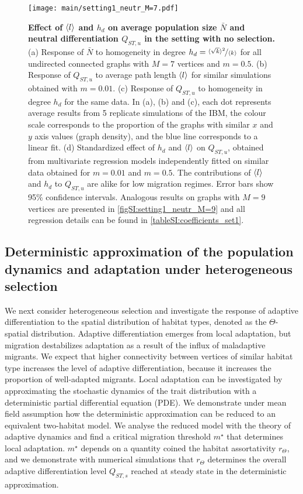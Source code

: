 \begin{figure}[ht]
    \centering
      \texttt{[image: main/setting1\_neutr\_M=7.pdf]}
      \caption{ 
      \textbf{Effect of $\langle l \rangle$ and $h_d$ on average population size $\bar{N}$ and neutral differentiation $Q_{ST,u}$ in the setting with no selection.}
      (a) Response of $\bar{N}$ to homogeneity in degree $h_d = \nicefrac{\langle \sqrt{k} \rangle^2}{\langle k \rangle}$ for all undirected connected graphs with $M=7$ vertices and $m=0.5$.
      (b) Response of $Q_{ST,u}$ to average path length $\langle l \rangle$ for similar simulations obtained with $m=0.01$.
      (c) Response of $Q_{ST,u}$ to homogeneity in degree $h_d$ for the same data.
      In (a), (b) and (c), each dot represents average results from 5 replicate simulations of the IBM, the colour scale corresponds to the proportion of the graphs with similar $x$ and $y$ axis values (graph density), and the blue line corresponds to a linear fit. 
      (d) Standardized effect of $h_d$ and $\langle l \rangle$ on $Q_{ST,u}$, obtained from multivariate regression models independently fitted on similar data obtained for $m = 0.01$ and $m=0.5$.
      The contributions of $\langle l \rangle$ and $h_d$ to $Q_{ST,u}$ are alike for low migration regimes. Error bars show 95\% confidence intervals.
      Analogous results on graphs with $M=9$ vertices are presented in \cref{figSI:setting1_neutr_M=9} and all regression details can be found in \cref{tableSI:coefficients_set1}.
       }
      \label{fig:setting1_neutr_M=7}
\end{figure}
\FloatBarrier

\subsection{Deterministic approximation of the population dynamics and adaptation under heterogeneous selection}\label{sec:result2a}

We next consider heterogeneous selection and investigate the response of adaptive differentiation to the spatial distribution of habitat types, denoted as the $\Theta$-spatial distribution. 
%
Adaptive differentiation emerges from local adaptation, but migration destabilizes adaptation as a result of the influx of maladaptive migrants. We expect that higher connectivity between vertices of similar habitat type increases the level of adaptive differentiation, because it increases the proportion of well-adapted migrants. Local adaptation can be investigated by approximating the stochastic dynamics of the trait distribution with a deterministic partial differential equation (PDE). We demonstrate under mean field assumption how the deterministic approximation can be reduced to an equivalent two-habitat model. We analyse the reduced model with the theory of adaptive dynamics \citep{Meszena1997,Mirrahimi2020} and find a critical migration threshold $m^\star$ that determines local adaptation. $m^\star$ depends on a quantity coined the habitat assortativity $r_\Theta$, and we demonstrate with numerical simulations that $r_\Theta$ determines the overall adaptive differentiation level $Q_{ST,s}$ reached at steady state in the deterministic approximation.

